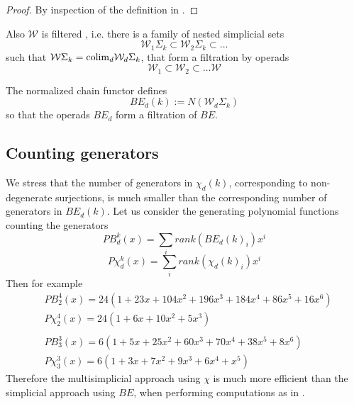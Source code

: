 \begin{proof}
By inspection of the definition in \cite{BFsmall}. %
\end{proof}

Also $\mathcal{W}$ is filtered \cite{BFsmall}, i.e.
there is a family of nested simplicial sets $$\mathcal{W}_1\Sigma_k \subset \mathcal{W}_2 \Sigma_k
 \subset \dots $$ such that
$\mathcal{W}\Sigma_k={\rm colim}_d \mathcal{W}_d\Sigma_k$, that form a filtration by operads
$$\mathcal{W}_1 \subset \mathcal{W}_2 \subset \dots \mathcal{W}$$


The normalized chain functor defines
$$BE_d(k):=N(\mathcal{W}_d \Sigma_k)$$ so that the operads $BE_d$
form a filtration of $BE$.

\subsection{Counting  generators}

We stress that the number of generators in $\chi_d(k)$, corresponding to non-degenerate surjections,
is much smaller than the corresponding number of generators in $BE_d(k)$.
Let us consider the generating polynomial functions counting the generators
$$PB_d^k(x) = \sum_i rank(BE_d(k)_i) x^i $$ $$P\chi_d^k(x)=
\sum_i rank(\chi_d(k)_i) x^i$$
Then for example
\begin{align*}
& PB_2^4(x)=24(1+23x+104x^2+196x^3+184x^4+86x^5+16x^6)\\
& P\chi_2^4(x)=24(1+6x+10x^2+5x^3) \\
& \\
& PB_3^3(x) = 6(1+5x+25x^2+60x^3+70x^4+38x^5+8x^6 ) \\
&  P\chi_3^3(x)= 6(1+3x+7x^2+9x^3+6x^4+x^5)
\end{align*}
Therefore the multisimplicial approach using $\chi$ is much more efficient than the simplicial
approach using $BE$, when performing computations as in \cite{formality}.


